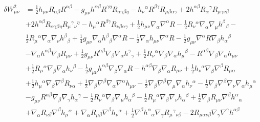 \documentclass[10pt,letterpaper]{article}
\numberwithin{equation}{section}
\begin{document}
\begin{align}
\delta W^2_{\mu\nu} &= \tfrac{1}{2} h_{\mu \nu} R_{\alpha \beta} R^{\alpha \beta} -  g_{\mu \nu} h^{\alpha \beta} R^{\gamma \eta} R_{\alpha \gamma \beta \eta} -  h_{\nu}{}^{\alpha} R^{\beta \gamma} R_{\mu \beta \alpha \gamma} + 2 h^{\alpha \beta} R_{\alpha}{}^{\gamma} R_{\mu \gamma \nu \beta} \\
&+ 2 h^{\alpha \beta} R_{\alpha \gamma \beta \eta} R_{\mu}{}^{\gamma}{}_{\nu}{}^{\eta} -  h_{\mu}{}^{\alpha} R^{\beta \gamma} R_{\nu \beta \alpha \gamma} + \tfrac{1}{2} h_{\mu \nu} \nabla_{\alpha}\nabla^{\alpha}R -  \tfrac{1}{2} R_{\nu}{}^{\alpha} \nabla_{\alpha}\nabla_{\mu}h^{\beta}{}_{\beta} -  \nonumber \\
&\tfrac{1}{2} R_{\mu}{}^{\alpha} \nabla_{\alpha}\nabla_{\nu}h^{\beta}{}_{\beta} + \tfrac{1}{4} g_{\mu \nu} \nabla_{\alpha}h^{\beta}{}_{\beta} \nabla^{\alpha}R -  \tfrac{1}{2} \nabla_{\alpha}h_{\mu \nu} \nabla^{\alpha}R -  \tfrac{1}{2} g_{\mu \nu} \nabla^{\alpha}R \nabla_{\beta}h_{\alpha}{}^{\beta} \nonumber \\
&-  \nabla_{\alpha}h^{\alpha \beta} \nabla_{\beta}R_{\mu \nu} + \tfrac{1}{2} g_{\mu \nu} R^{\alpha \beta} \nabla_{\beta}\nabla_{\alpha}h^{\gamma}{}_{\gamma} + \tfrac{1}{2} R_{\nu}{}^{\alpha} \nabla_{\beta}\nabla_{\alpha}h_{\mu}{}^{\beta} -  R^{\alpha \beta} \nabla_{\beta}\nabla_{\alpha}h_{\mu \nu} \nonumber \\
&+ \tfrac{1}{2} R_{\mu}{}^{\alpha} \nabla_{\beta}\nabla_{\alpha}h_{\nu}{}^{\beta} -  \tfrac{1}{2} g_{\mu \nu} h^{\alpha \beta} \nabla_{\beta}\nabla_{\alpha}R -  h^{\alpha \beta} \nabla_{\beta}\nabla_{\alpha}R_{\mu \nu} + \tfrac{1}{2} h_{\nu}{}^{\alpha} \nabla_{\beta}\nabla^{\beta}R_{\mu \alpha} \nonumber \\
&+ \tfrac{1}{2} h_{\mu}{}^{\alpha} \nabla_{\beta}\nabla^{\beta}R_{\nu \alpha} + \tfrac{1}{2} \nabla_{\beta}\nabla^{\beta}\nabla_{\alpha}\nabla^{\alpha}h_{\mu \nu} -  \tfrac{1}{2} \nabla_{\beta}\nabla^{\beta}\nabla_{\mu}\nabla_{\alpha}h_{\nu}{}^{\alpha} -  \tfrac{1}{2} \nabla_{\beta}\nabla^{\beta}\nabla_{\nu}\nabla_{\alpha}h_{\mu}{}^{\alpha}\nonumber \\
& -  g_{\mu \nu} R^{\alpha \beta} \nabla_{\beta}\nabla_{\gamma}h_{\alpha}{}^{\gamma} -  \tfrac{1}{2} R_{\nu}{}^{\alpha} \nabla_{\beta}\nabla_{\mu}h_{\alpha}{}^{\beta} -  \tfrac{1}{2} R_{\mu}{}^{\alpha} \nabla_{\beta}\nabla_{\nu}h_{\alpha}{}^{\beta} + \tfrac{1}{2} \nabla_{\beta}R_{\mu \nu} \nabla^{\beta}h^{\alpha}{}_{\alpha}\nonumber \\
& + \nabla_{\alpha}R_{\nu \beta} \nabla^{\beta}h_{\mu}{}^{\alpha} + \nabla_{\alpha}R_{\mu \beta} \nabla^{\beta}h_{\nu}{}^{\alpha} + \tfrac{1}{2} \nabla^{\beta}h^{\alpha}{}_{\alpha} \nabla_{\gamma}R_{\mu}{}^{\gamma}{}_{\nu \beta} - 2 R_{\mu \alpha \nu \beta} \nabla_{\gamma}\nabla^{\gamma}h^{\alpha \beta}\nonumber \\

\end{align}
\end{document}
